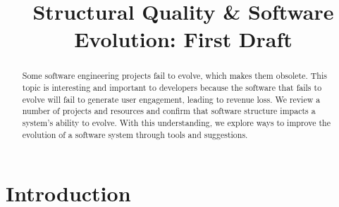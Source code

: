 \documentclass[12pt,conference]{IEEEtran}
\begin{document}
\pagestyle{plain}

\title{Structural Quality \& Software Evolution: \newline First Draft}

\author{
}

\maketitle

\begin{abstract}

Some software engineering projects fail to evolve, which makes them obsolete.
This topic is interesting and important to developers because the software that fails to evolve will fail to generate user engagement, leading to revenue loss.
We review a number of projects and resources and confirm that software structure impacts a system's ability to evolve.
With this understanding, we explore ways to improve the evolution of a software system through tools and suggestions.

\end{abstract}


\vspace{0.5cm}
\section{Introduction}
\vspace{0.25cm}
\end{document}
